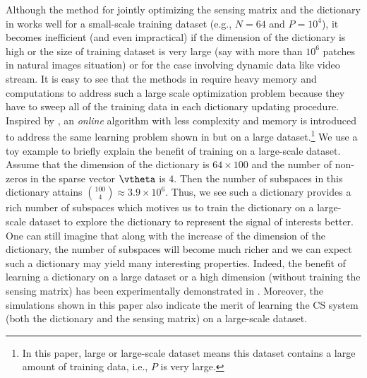 \documentclass[final,5p,times,twocolumn]{elsarticle}
\begin{document}
Although the  method for jointly optimizing the sensing matrix and the dictionary in \cite{DCS09,BLLLJC15} works well for a small-scale training dataset (e.g., $N = 64$ and $P=10^4$), it becomes inefficient (and even impractical) if the dimension of the dictionary is high or the size of training dataset is very large (say with more than $10^6$ patches in natural images situation) or for the case involving dynamic data like video stream. It is easy to see that the methods in \cite{DCS09,BLLLJC15} require heavy memory and computations to address such a large scale optimization problem because they have to sweep all of the training data in each dictionary updating procedure. Inspired by \cite{MBPS09,MBPS10}, an \emph{online} algorithm with less complexity and memory is introduced to address the same learning problem shown in \cite{DCS09,BLLLJC15} but on a large dataset.\footnote{In this paper, large or large-scale dataset means this dataset contains a large amount of training data, i.e., $P$ is very large.} { We use a toy example to briefly explain the benefit of training on a large-scale dataset. Assume that the dimension of the dictionary is $64\times 100$ and the number of non-zeros in the sparse vector $\vtheta$ is $4$. Then the number of subspaces in this dictionary attains $\binom{100}{4}\approx 3.9\times 10^6$. Thus, we see such a dictionary provides a rich number of subspaces which motives us to train the dictionary on a large-scale dataset to explore the dictionary to represent the signal of interests better. One can still imagine that along with the increase of the dimension of the dictionary, the number of subspaces will become much richer and we can expect such a dictionary may yield many interesting properties. Indeed, the benefit of learning a dictionary on a large dataset or a high dimension (without training the sensing matrix) has been experimentally demonstrated in \cite{Jere16,Jere16SPL,RHGZ16}. Moreover, the simulations shown in this paper also indicate the merit of learning the CS system (both the dictionary and the sensing matrix) on a large-scale dataset.}%

%
\end{document}
